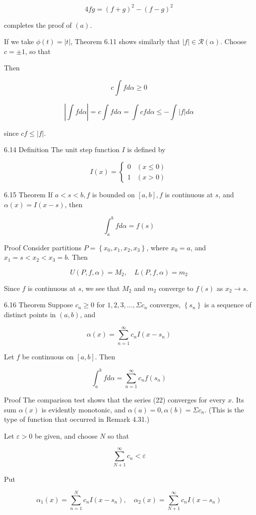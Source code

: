 \documentclass[10pt]{article}
\begin{document}
$$
4 f g=(f+g)^{2}-(f-g)^{2}
$$

completes the proof of $(a)$.

If we take $\phi(t)=|t|$, Theorem 6.11 shows similarly that $|f| \in \mathscr{R}(\alpha)$. Choose $c= \pm 1$, so that

Then

$$
c \int f d \alpha \geq 0
$$

$$
\left|\int f d \alpha\right|=c \int f d \alpha=\int c f d \alpha \leq-\int|f| d \alpha
$$

since $c f \leq|f|$.

6.14 Definition The unit step function $I$ is defined by

$$
I(x)= \begin{cases}0 & (x \leq 0) \\ 1 & (x>0)\end{cases}
$$

6.15 Theorem If $a<s<b, f$ is bounded on $[a, b], f$ is continuous at $s$, and $\alpha(x)=I(x-s)$, then

$$
\int_{a}^{b} f d \alpha=f(s)
$$

Proof Consider partitions $P=\left\{x_{0}, x_{1}, x_{2}, x_{3}\right\}$, where $x_{0}=a$, and $x_{1}=s<x_{2}<x_{3}=b$. Then

$$
U(P, f, \alpha)=M_{2}, \quad L(P, f, \alpha)=m_{2}
$$

Since $f$ is continuous at $s$, we see that $M_{2}$ and $m_{2}$ converge to $f(s)$ as $x_{2} \rightarrow s$.

6.16 Theorem Suppose $c_{n} \geq 0$ for $1,2,3, \ldots, \Sigma c_{n}$ converges, $\left\{s_{n}\right\}$ is a sequence of distinct points in $(a, b)$, and

$$
\alpha(x)=\sum_{n=1}^{\infty} c_{n} I\left(x-s_{n}\right)
$$

Let $f$ be continuous on $[a, b]$. Then

$$
\int_{a}^{b} f d \alpha=\sum_{n=1}^{\infty} c_{n} f\left(s_{n}\right)
$$

Proof The comparison test shows that the series (22) converges for every $x$. Its sum $\alpha(x)$ is evidently monotonic, and $\alpha(a)=0, \alpha(b)=\Sigma c_{n}$. (This is the type of function that occurred in Remark 4.31.)

Let $\varepsilon>0$ be given, and choose $N$ so that

$$
\sum_{N+1}^{\infty} c_{n}<\varepsilon
$$

Put

$$
\alpha_{1}(x)=\sum_{n=1}^{N} c_{n} I\left(x-s_{n}\right), \quad \alpha_{2}(x)=\sum_{N+1}^{\infty} c_{n} I\left(x-s_{n}\right)
$$
\end{document}
